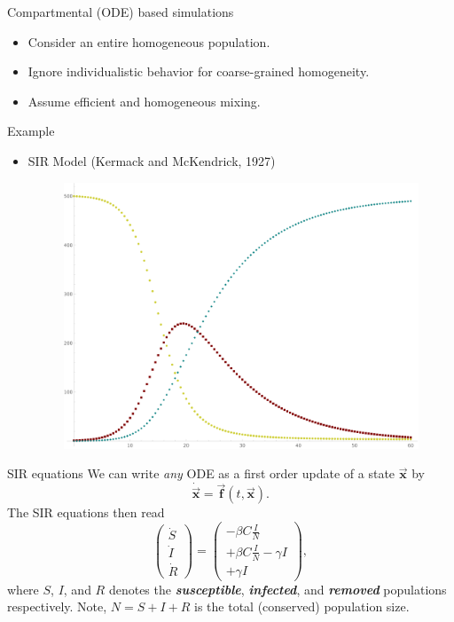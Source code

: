 \documentclass[aspectratio=169]{beamer}
\newcommand{\vecx}{\boldsymbol{\vec{x}}}
\newcommand{\vecf}{\boldsymbol{\vec{f}}}
\newcommand{\xdot}{\boldsymbol{\dot{\vec{x}}}}
\newcommand\boldgreen[1]{\textcolor{lighter_csu_green}{\emph{\textbf{#1}}}}
\begin{document}
\begin{frame}{Compartmental (ODE) based simulations}
    \vfill
    \begin{itemize}
    \pause
        \item Consider an entire homogeneous population.
        \pause
        \item Ignore individualistic behavior for coarse-grained homogeneity.
        \pause
        \item Assume efficient and homogeneous mixing.
    \end{itemize}
    \vfill
\end{frame}

\begin{frame}{Example}
    \vfill
    \begin{itemize}
    \pause
        \item SIR Model (Kermack and McKendrick, 1927)
        \vspace*{1cm}
        \begin{figure}[H]
            \centering
            \includegraphics[width=.5\textwidth]{figures/sir_curves.png}
        \end{figure}
    \end{itemize}
    \vfill
\end{frame}

\begin{frame}{SIR equations}
    \vfill
    \pause
    We can write \emph{any} ODE as a first order update of a state $\vecx$ by
    \[
    \xdot = \vecf(t,\vecx).
    \]
    \pause
    The SIR equations then read
    \[
    \begin{pmatrix} \dot{S} \\ \dot{I} \\ \dot{R} \end{pmatrix} = \begin{pmatrix} -\beta C \frac{I}{N} \\ +\beta C \frac{I}{N} - \gamma I \\ + \gamma I \end{pmatrix}, 
    \]
    where $S$, $I$, and $R$ denotes the \boldgreen{susceptible}, \boldgreen{infected}, and \boldgreen{removed} populations respectively. Note, $N=S+I+R$ is the total (conserved) population size.
    \vfill
\end{frame}
\end{document}
